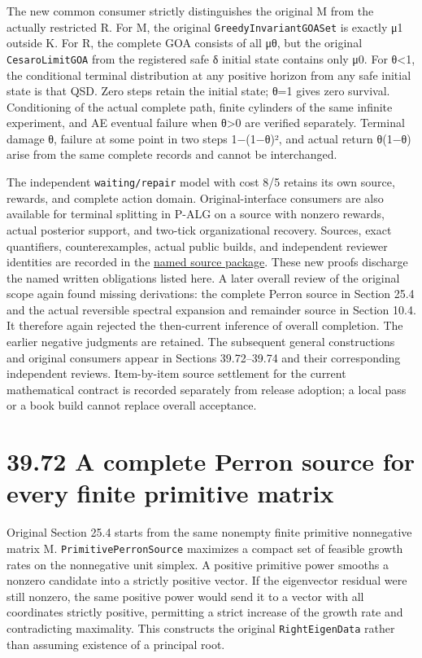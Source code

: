 \documentclass[
  english,
  11pt,
  oneside]{book}
\newcounter{none} %
\begin{document}
The new common consumer strictly distinguishes the original M from the actually restricted R. For M, the original \nolinkurl{GreedyInvariantGOASet} is exactly μ1 outside K. For R, the complete GOA consists of all μθ, but the original \nolinkurl{CesaroLimitGOA} from the registered safe δ initial state contains only μ0. For θ\textless1, the conditional terminal distribution at any positive horizon from any safe initial state is that QSD. Zero steps retain the initial state; θ=1 gives zero survival. Conditioning of the actual complete path, finite cylinders of the same infinite experiment, and AE eventual failure when θ\textgreater0 are verified separately. Terminal damage θ, failure at some point in two steps 1−(1−θ)², and actual return θ(1−θ) arise from the same complete records and cannot be interchanged.

The independent \nolinkurl{waiting/repair} model with cost 8/5 retains its own source, rewards, and complete action domain. Original-interface consumers are also available for terminal splitting in P-ALG on a source with nonzero rewards, actual posterior support, and two-tick organizational recovery. Sources, exact quantifiers, counterexamples, actual public builds, and independent reviewer identities are recorded in the \href{../formalization/ueot-core/docs/compression/theory_completion/unified_closure/conflict_family_book_source_v1/RESULTS_AND_OPEN_OBLIGATIONS.md}{named source package}. These new proofs discharge the named written obligations listed here. A later overall review of the original scope again found missing derivations: the complete Perron source in Section 25.4 and the actual reversible spectral expansion and remainder source in Section 10.4. It therefore again rejected the then-current inference of overall completion. The earlier negative judgments are retained. The subsequent general constructions and original consumers appear in Sections 39.72--39.74 and their corresponding independent reviews. Item-by-item source settlement for the current mathematical contract is recorded separately from release adoption; a local pass or a book build cannot replace overall acceptance.

\section{39.72 A complete Perron source for every finite primitive matrix}\label{a-complete-perron-source-for-every-finite-primitive-matrix}

Original Section 25.4 starts from the same nonempty finite primitive nonnegative matrix M. \nolinkurl{PrimitivePerronSource} maximizes a compact set of feasible growth rates on the nonnegative unit simplex. A positive primitive power smooths a nonzero candidate into a strictly positive vector. If the eigenvector residual were still nonzero, the same positive power would send it to a vector with all coordinates strictly positive, permitting a strict increase of the growth rate and contradicting maximality. This constructs the original \nolinkurl{RightEigenData} rather than assuming existence of a principal root.
\end{document}
